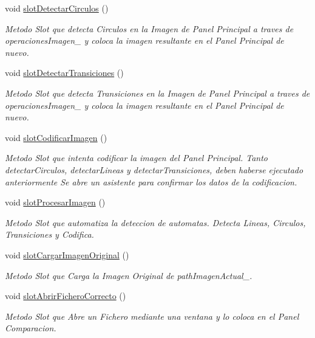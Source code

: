 \begin{DoxyCompactItemize}
void \hyperlink{classCAplicacion_af8fa414d46ce7a61ab9c3d19ee18a7c1}{slot\+Detectar\+Circulos} ()
\begin{DoxyCompactList}\small\item\em Metodo Slot que detecta Circulos en la Imagen de Panel Principal a traves de operaciones\+Imagen\+\_\+ y coloca la imagen resultante en el Panel Principal de nuevo. \end{DoxyCompactList}\item 
void \hyperlink{classCAplicacion_a02f4c3cd425565a9c675a10a5d9b0954}{slot\+Detectar\+Transiciones} ()
\begin{DoxyCompactList}\small\item\em Metodo Slot que detecta Transiciones en la Imagen de Panel Principal a traves de operaciones\+Imagen\+\_\+ y coloca la imagen resultante en el Panel Principal de nuevo. \end{DoxyCompactList}\item 
void \hyperlink{classCAplicacion_a87253da47e41e28e7bb911b39a885cd7}{slot\+Codificar\+Imagen} ()
\begin{DoxyCompactList}\small\item\em Metodo Slot que intenta codificar la imagen del Panel Principal. Tanto detectar\+Circulos, detectar\+Lineas y detectar\+Transiciones, deben haberse ejecutado anteriormente Se abre un asistente para confirmar los datos de la codificacion. \end{DoxyCompactList}\item 
void \hyperlink{classCAplicacion_a8855c72841e3b45c0873b9ee009df523}{slot\+Procesar\+Imagen} ()
\begin{DoxyCompactList}\small\item\em Metodo Slot que automatiza la deteccion de automatas. Detecta Lineas, Circulos, Transiciones y Codifica. \end{DoxyCompactList}\item 
void \hyperlink{classCAplicacion_a7f655c9e187d1ac28223b6bac96fd61c}{slot\+Cargar\+Imagen\+Original} ()
\begin{DoxyCompactList}\small\item\em Metodo Slot que Carga la Imagen Original de path\+Imagen\+Actual\+\_\+. \end{DoxyCompactList}\item 
void \hyperlink{classCAplicacion_a54ab1051a4cfd1a26b4081032dac96e0}{slot\+Abrir\+Fichero\+Correcto} ()
\begin{DoxyCompactList}\small\item\em Metodo Slot que Abre un Fichero mediante una ventana y lo coloca en el Panel Comparacion. \end{DoxyCompactList}\item 

\end{DoxyCompactItemize}
